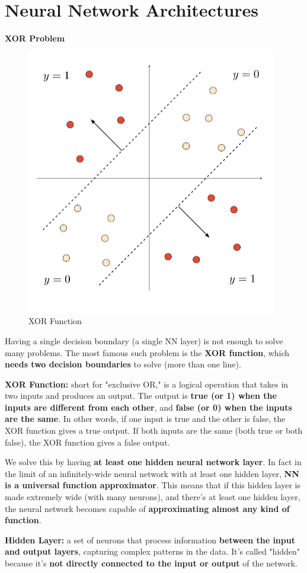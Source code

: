 \newpage

\section{Neural Network Architectures}

\textbf{XOR Problem}\\

\begin{figure} [h!t]
    \centering
    \includegraphics[width=0.35\linewidth]{xor.png}
    \caption{XOR Function}
    \label{fig:enter-label}
\end{figure}

Having a single decision boundary (a single NN layer) is not enough to solve many problems. The most famous such problem is the \textbf{XOR function}, which \textbf{needs two decision boundaries} to solve (more than one line).

\begin{definition}
    \textbf{XOR Function:} short for "exclusive OR," is a logical operation that takes in two inputs and produces an output. The output is \textbf{true (or 1) when the inputs are different from each other}, and \textbf{false (or 0) when the inputs are the same}. In other words, if one input is true and the other is false, the XOR function gives a true output. If both inputs are the same (both true or both false), the XOR function gives a false output.
\end{definition}

We solve this by having \textbf{at least one hidden neural network layer}. In fact in the limit of an infinitely-wide neural network with at least one hidden layer, \textbf{NN is a universal function approximator}. This means that if this hidden layer is made extremely wide (with many neurons), and there's at least one hidden layer, the neural network becomes capable of \textbf{approximating almost any kind of function}.


\begin{definition}
   \textbf{ Hidden Layer:} a set of neurons that process information \textbf{between the input and output layers}, capturing complex patterns in the data. It's called "hidden" because it's \textbf{not directly connected to the input or output} of the network.
\end{definition}

